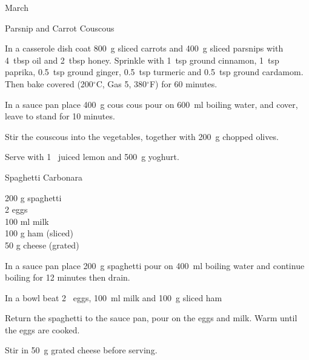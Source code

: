 \begin{menu}{March}
\begin{recipe}{2}{Parsnip and Carrot Couscous}
    \begin{instructions}
    \item 
        In a casserole dish coat
        800~g sliced carrots
        and
        400~g sliced parsnips
        with
        4~tbsp  oil
        and
        2~tbsp  honey.
        Sprinkle with
        1~tsp  ground cinnamon,
        1~tsp  paprika,
        0.5~tsp  ground ginger,
        0.5~tsp  turmeric
        and
        0.5~tsp  ground cardamom.
        Then bake covered
        (200$^{\circ}$C, Gas 5, 380$^{\circ}$F)
        for 60 minutes.
      \item 
    In a
    sauce pan 
    place
    400~g  cous cous
    pour on
    600~ml  boiling water,
    and cover, leave to stand for 10 minutes.
  \item 
        Stir the couscous into the vegetables,
        together with
        200~g chopped olives.
      \item 
        Serve with 1~ juiced lemon
        and
        500~g  yoghurt.
      
    \end{instructions}
    \end{recipe}%
  
    \begin{recipe}{1}{Spaghetti Carbonara}%
		\begin{ingredients}
		200 g spaghetti  \\
	2  eggs  \\
	100 ml milk  \\
	100 g ham (sliced) \\
	50 g cheese (grated) \\
	
		\end{ingredients}
	
	
	
    \begin{instructions}
    \item 
    In a
    sauce pan
    place
    200~g  spaghetti
    pour on
    400~ml  boiling water and continue boiling for 12 minutes then drain.
  \item 
        In a bowl beat
        2~  eggs,
        100~ml  milk
        and
        100~g sliced ham\item 
        Return the spaghetti to the sauce pan,
        pour on the eggs and milk.
        Warm until the eggs are cooked.
      \item 
        Stir in
        50~g grated cheese
        before serving.
      
    \end{instructions}
    \end{recipe}%
  
    \clearpage
    \end{menu}
	
